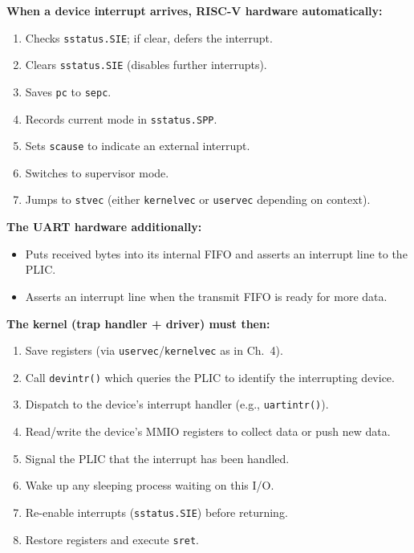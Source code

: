 \documentclass[11pt, a4paper]{article}
\begin{document}
\begin{tcolorbox}[hardware]
\textbf{When a device interrupt arrives, RISC-V hardware automatically:}
\begin{enumerate}[leftmargin=1.8em, itemsep=0.2em]
  \item Checks \lstinline|sstatus.SIE|; if clear, defers the interrupt.
  \item Clears \lstinline|sstatus.SIE| (disables further interrupts).
  \item Saves \lstinline|pc| to \lstinline|sepc|.
  \item Records current mode in \lstinline|sstatus.SPP|.
  \item Sets \lstinline|scause| to indicate an external interrupt.
  \item Switches to supervisor mode.
  \item Jumps to \lstinline|stvec| (either \lstinline|kernelvec| or \lstinline|uservec| depending on context).
\end{enumerate}
\textbf{The UART hardware additionally:}
\begin{itemize}[leftmargin=1.5em, itemsep=0.1em]
  \item Puts received bytes into its internal FIFO and asserts an interrupt line to the PLIC.
  \item Asserts an interrupt line when the transmit FIFO is ready for more data.
\end{itemize}
\end{tcolorbox}

\vspace{0.8em}

\begin{tcolorbox}[kernel]
\textbf{The kernel (trap handler + driver) must then:}
\begin{enumerate}[leftmargin=1.8em, itemsep=0.2em]
  \item Save registers (via \lstinline|uservec|/\lstinline|kernelvec| as in Ch.~4).
  \item Call \lstinline|devintr()| which queries the PLIC to identify the interrupting device.
  \item Dispatch to the device's interrupt handler (e.g., \lstinline|uartintr()|).
  \item Read/write the device's MMIO registers to collect data or push new data.
  \item Signal the PLIC that the interrupt has been handled.
  \item Wake up any sleeping process waiting on this I/O.
  \item Re-enable interrupts (\lstinline|sstatus.SIE|) before returning.
  \item Restore registers and execute \lstinline|sret|.
\end{enumerate}
\end{tcolorbox}
\end{document}
